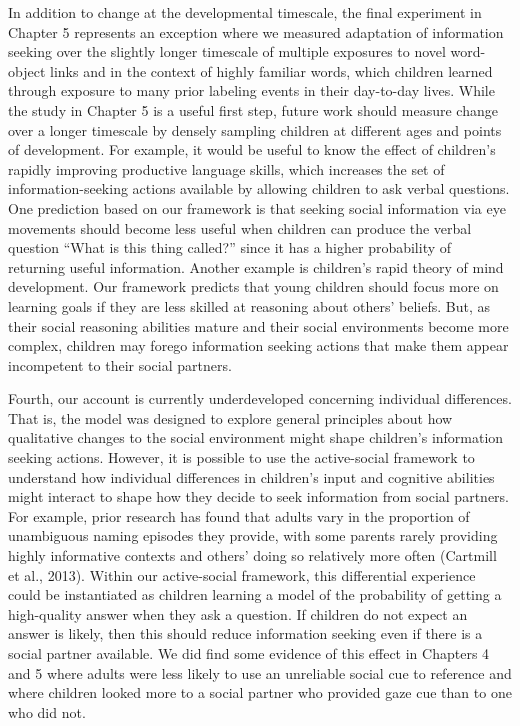 \documentclass[oneside]{report}
\begin{document}
In addition to change at the developmental timescale, the final
experiment in Chapter 5 represents an exception where we measured
adaptation of information seeking over the slightly longer timescale of
multiple exposures to novel word-object links and in the context of
highly familiar words, which children learned through exposure to many
prior labeling events in their day-to-day lives. While the study in
Chapter 5 is a useful first step, future work should measure change over
a longer timescale by densely sampling children at different ages and
points of development. For example, it would be useful to know the
effect of children's rapidly improving productive language skills, which
increases the set of information-seeking actions available by allowing
children to ask verbal questions. One prediction based on our framework
is that seeking social information via eye movements should become less
useful when children can produce the verbal question ``What is this
thing called?'' since it has a higher probability of returning useful
information. Another example is children's rapid theory of mind
development. Our framework predicts that young children should focus
more on learning goals if they are less skilled at reasoning about
others' beliefs. But, as their social reasoning abilities mature and
their social environments become more complex, children may forego
information seeking actions that make them appear incompetent to their
social partners.

Fourth, our account is currently underdeveloped concerning individual
differences. That is, the model was designed to explore general
principles about how qualitative changes to the social environment might
shape children's information seeking actions. However, it is possible to
use the active-social framework to understand how individual differences
in children's input and cognitive abilities might interact to shape how
they decide to seek information from social partners. For example, prior
research has found that adults vary in the proportion of unambiguous
naming episodes they provide, with some parents rarely providing highly
informative contexts and others' doing so relatively more often
(Cartmill et al., 2013). Within our active-social framework, this
differential experience could be instantiated as children learning a
model of the probability of getting a high-quality answer when they ask
a question. If children do not expect an answer is likely, then this
should reduce information seeking even if there is a social partner
available. We did find some evidence of this effect in Chapters 4 and 5
where adults were less likely to use an unreliable social cue to
reference and where children looked more to a social partner who
provided gaze cue than to one who did not.
\end{document}
